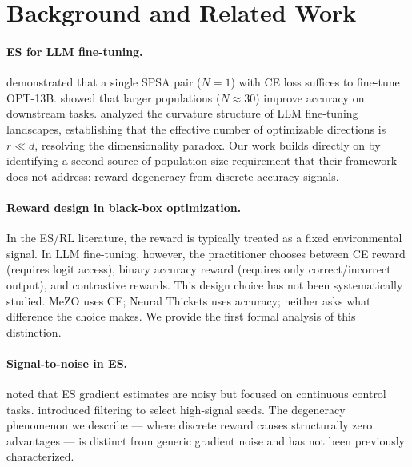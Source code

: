 \documentclass[11pt]{article}
\theoremstyle{definition}
\theoremstyle{remark}
\begin{document}
\section{Background and Related Work}
\label{sec:background}

\paragraph{ES for LLM fine-tuning.}
\citet{malladi2023mezo} demonstrated that a single SPSA pair ($N=1$) with CE loss suffices to fine-tune OPT-13B. \citet{qiu2024esscale} showed that larger populations ($N \approx 30$) improve accuracy on downstream tasks. \citet{liang2026blessing} analyzed the curvature structure of LLM fine-tuning landscapes, establishing that the effective number of optimizable directions is $r \ll d$, resolving the dimensionality paradox. Our work builds directly on \citet{liang2026blessing} by identifying a second source of population-size requirement that their framework does not address: reward degeneracy from discrete accuracy signals.

\paragraph{Reward design in black-box optimization.}
In the ES/RL literature, the reward is typically treated as a fixed environmental signal. In LLM fine-tuning, however, the practitioner chooses between CE reward (requires logit access), binary accuracy reward (requires only correct/incorrect output), and contrastive rewards. This design choice has not been systematically studied. MeZO \citep{malladi2023mezo} uses CE; Neural Thickets \citep{gan2026thickets} uses accuracy; neither asks what difference the choice makes. We provide the first formal analysis of this distinction.

\paragraph{Signal-to-noise in ES.}
\citet{salimans2017openai} noted that ES gradient estimates are noisy but focused on continuous control tasks. \citet{mania2018ars} introduced filtering to select high-signal seeds. The degeneracy phenomenon we describe --- where discrete reward causes structurally zero advantages --- is distinct from generic gradient noise and has not been previously characterized.

\end{document}
